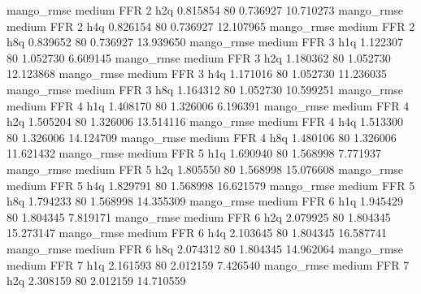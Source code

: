        mango_rmse     medium      FFR                 2                  h2q  0.815854 80       0.736927          10.710273
       mango_rmse     medium      FFR                 2                  h4q  0.826154 80       0.736927          12.107965
       mango_rmse     medium      FFR                 2                  h8q  0.839652 80       0.736927          13.939650
       mango_rmse     medium      FFR                 3                  h1q  1.122307 80       1.052730           6.609145
       mango_rmse     medium      FFR                 3                  h2q  1.180362 80       1.052730          12.123868
       mango_rmse     medium      FFR                 3                  h4q  1.171016 80       1.052730          11.236035
       mango_rmse     medium      FFR                 3                  h8q  1.164312 80       1.052730          10.599251
       mango_rmse     medium      FFR                 4                  h1q  1.408170 80       1.326006           6.196391
       mango_rmse     medium      FFR                 4                  h2q  1.505204 80       1.326006          13.514116
       mango_rmse     medium      FFR                 4                  h4q  1.513300 80       1.326006          14.124709
       mango_rmse     medium      FFR                 4                  h8q  1.480106 80       1.326006          11.621432
       mango_rmse     medium      FFR                 5                  h1q  1.690940 80       1.568998           7.771937
       mango_rmse     medium      FFR                 5                  h2q  1.805550 80       1.568998          15.076608
       mango_rmse     medium      FFR                 5                  h4q  1.829791 80       1.568998          16.621579
       mango_rmse     medium      FFR                 5                  h8q  1.794233 80       1.568998          14.355309
       mango_rmse     medium      FFR                 6                  h1q  1.945429 80       1.804345           7.819171
       mango_rmse     medium      FFR                 6                  h2q  2.079925 80       1.804345          15.273147
       mango_rmse     medium      FFR                 6                  h4q  2.103645 80       1.804345          16.587741
       mango_rmse     medium      FFR                 6                  h8q  2.074312 80       1.804345          14.962064
       mango_rmse     medium      FFR                 7                  h1q  2.161593 80       2.012159           7.426540
       mango_rmse     medium      FFR                 7                  h2q  2.308159 80       2.012159          14.710559
